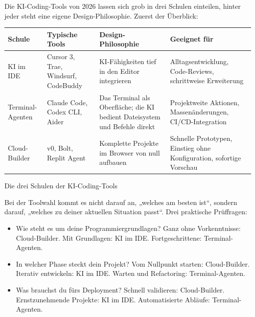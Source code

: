 


Die KI-Coding-Tools von 2026 lassen sich grob in drei Schulen einteilen, hinter jeder steht eine eigene Design-Philosophie. Zuerst der Überblick:

\begin{center}
\begin{tabularx}{\linewidth}{|X|X|X|X|}
\hline
\textbf{Schule} & \textbf{Typische Tools} & \textbf{Design-Philosophie} & \textbf{Geeignet für} \tabularnewline
\hline
KI im IDE & Cursor 3, Trae, Windsurf, CodeBuddy & KI-Fähigkeiten tief in den Editor integrieren & Alltagsentwicklung, Code-Reviews, schrittweise Erweiterung \tabularnewline
Terminal-Agenten & Claude Code, Codex CLI, Aider & Das Terminal als Oberfläche; die KI bedient Dateisystem und Befehle direkt & Projektweite Aktionen, Massenänderungen, CI/CD-Integration \tabularnewline
Cloud-Builder & v0, Bolt, Replit Agent & Komplette Projekte im Browser von null aufbauen & Schnelle Prototypen, Einstieg ohne Konfiguration, sofortige Vorschau \tabularnewline
\hline
\end{tabularx}
\end{center}

\begin{center}\small\color{gray}Die drei Schulen der KI-Coding-Tools\end{center}

Bei der Toolwahl kommt es nicht darauf an, „welches am besten ist“, sondern darauf, „welches zu deiner aktuellen Situation passt“. Drei praktische Prüffragen:

\begin{itemize}
  \item Wie steht es um deine Programmiergrundlagen? Ganz ohne Vorkenntnisse: Cloud-Builder. Mit Grundlagen: KI im IDE. Fortgeschrittene: Terminal-Agenten.
  \item In welcher Phase steckt dein Projekt? Vom Nullpunkt starten: Cloud-Builder. Iterativ entwickeln: KI im IDE. Warten und Refactoring: Terminal-Agenten.
  \item Was brauchst du fürs Deployment? Schnell validieren: Cloud-Builder. Ernstzunehmende Projekte: KI im IDE. Automatisierte Abläufe: Terminal-Agenten.
\end{itemize}

